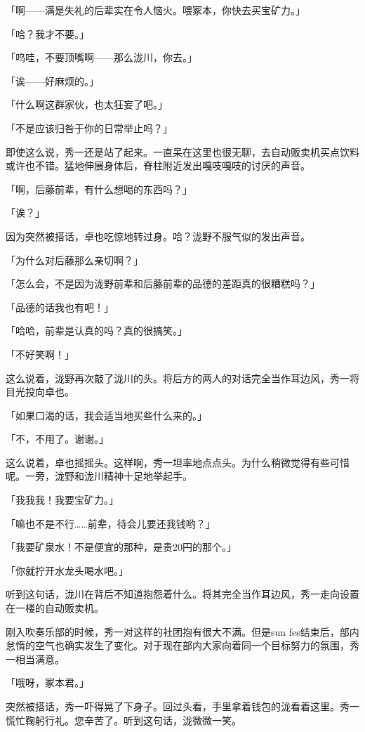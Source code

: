 \documentclass[UTF8]{ctexart}
\begin{document}
    「啊——满是失礼的后辈实在令人恼火。喂冢本，你快去买宝矿力。」

    「哈？我才不要。」

    「呜哇，不要顶嘴啊——那么泷川，你去。」

    「诶——好麻烦的。」

    「什么啊这群家伙，也太狂妄了吧。」

    「不是应该归咎于你的日常举止吗？」

    即使这么说，秀一还是站了起来。一直呆在这里也很无聊，去自动贩卖机买点饮料或许也不错。猛地伸展身体后，脊柱附近发出嘎吱嘎吱的讨厌的声音。

    「啊，后藤前辈，有什么想喝的东西吗？」

    「诶？」

    因为突然被搭话，卓也吃惊地转过身。哈？泷野不服气似的发出声音。

    「为什么对后藤那么亲切啊？」

    「怎么会，不是因为泷野前辈和后藤前辈的品德的差距真的很糟糕吗？」

    「品德的话我也有吧！」

    「哈哈，前辈是认真的吗？真的很搞笑。」

    「不好笑啊！」

    这么说着，泷野再次敲了泷川的头。将后方的两人的对话完全当作耳边风，秀一将目光投向卓也。

    「如果口渴的话，我会适当地买些什么来的。」

    「不，不用了。谢谢。」

    这么说着，卓也摇摇头。这样啊，秀一坦率地点点头。为什么稍微觉得有些可惜呢。一旁，泷野和泷川精神十足地举起手。

    「我我我！我要宝矿力。」

    「嘛也不是不行……前辈，待会儿要还我钱哟？」

    「我要矿泉水！不是便宜的那种，是贵20円的那个。」

    「你就拧开水龙头喝水吧。」

    听到这句话，泷川在背后不知道抱怨着什么。将其完全当作耳边风，秀一走向设置在一楼的自动贩卖机。

    刚入吹奏乐部的时候，秀一对这样的社团抱有很大不满。但是sun fes结束后，部内怠惰的空气也确实发生了变化。对于现在部内大家向着同一个目标努力的氛围，秀一相当满意。

    「哦呀，冢本君。」

    突然被搭话，秀一吓得晃了下身子。回过头看，手里拿着钱包的泷看着这里。秀一慌忙鞠躬行礼。您辛苦了。听到这句话，泷微微一笑。
\end{document}
